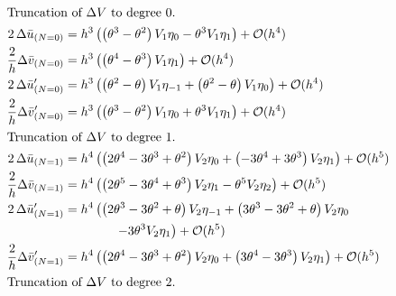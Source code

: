 \begin{align*}
  \intertext{Truncation of $\Delta V$ to degree $0$.}
  2\,\Delta \bar{u}_{(N=0)}          & = h^{3}\left(\left(\theta^{3} - \theta^{2}\right) V_{1} \eta_{0} -\theta^{3} V_{1} \eta_{1}\right) + \mathcal{O}(h^{4})                                                                    \\
  \frac{2}{h}\Delta \bar{v}_{(N=0)}  & = h^{3}\left(\left(\theta^{4} - \theta^{3}\right) V_{1} \eta_{1}\right) + \mathcal{O}(h^{4})                                                                                               \\
  2\,\Delta \bar{u}'_{(N=0)}         & = h^{3}\left(\left(\theta^{2} - \theta\right) V_{1} \eta_{-1} + \left(\theta^{2} - \theta\right) V_{1} \eta_{0}\right) + \mathcal{O}(h^{4})                                                \\
  \frac{2}{h}\Delta \bar{v}'_{(N=0)} & = h^{3}\left(\left(\theta^{3} - \theta^{2}\right) V_{1} \eta_{0} + \theta^{3} V_{1} \eta_{1}\right) + \mathcal{O}(h^{4})                                                                   \\
  \intertext{Truncation of $\Delta V$ to degree $1$.}
  2\,\Delta \bar{u}_{(N=1)}          & = h^{4}\left(\left(2 \theta^{4} - 3 \theta^{3} + \theta^{2}\right) V_{2} \eta_{0} + \left(-3 \theta^{4} + 3 \theta^{3}\right) V_{2} \eta_{1}\right) + \mathcal{O}(h^{5})                   \\
  \frac{2}{h}\Delta \bar{v}_{(N=1)}  & = h^{4}\left(\left(2 \theta^{5} - 3 \theta^{4} + \theta^{3}\right) V_{2} \eta_{1} - \theta^{5} V_{2} \eta_{2}\right) + \mathcal{O}(h^{5})                                    \\
  2\,\Delta \bar{u}'_{(N=1)}         & = h^{4}\left(\left(2 \theta^{3} - 3 \theta^{2} + \theta\right) V_{2} \eta_{-1} + \left(3 \theta^{3} - 3 \theta^{2} + \theta\right) V_{2} \eta_{0} \right.                                  \\
                                     & \qquad\qquad \left. - 3 \theta^{3} V_{2} \eta_{1}\right) + \mathcal{O}(h^{5})                                                                                                \\
  \frac{2}{h}\Delta \bar{v}'_{(N=1)} & = h^{4}\left(\left(2 \theta^{4} - 3 \theta^{3} + \theta^{2}\right) V_{2} \eta_{0} + \left(3 \theta^{4} - 3 \theta^{3}\right) V_{2} \eta_{1}\right) + \mathcal{O}(h^{5})                    \\
  \intertext{Truncation of $\Delta V$ to degree $2$.}

\end{align*}
